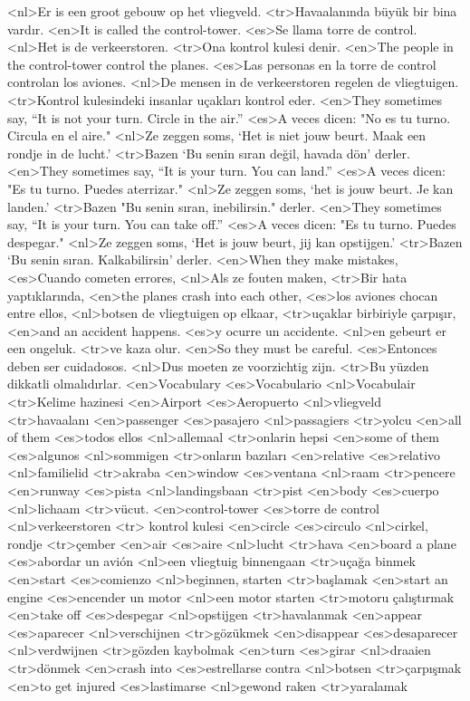 <nl>Er is een groot gebouw op het vliegveld.
<tr>Havaalanında büyük bir bina vardır.
<en>It is called the control-tower.
<es>Se llama torre de control.
<nl>Het is de verkeerstoren.
<tr>Ona kontrol kulesi denir.
<en>The people in the control-tower control the planes.
<es>Las personas en la torre de control controlan los aviones.
<nl>De mensen in de verkeerstoren regelen de vliegtuigen.
<tr>Kontrol kulesindeki insanlar uçakları kontrol eder.
<en>They sometimes say, “It is not your turn. Circle in the air.”
<es>A veces dicen: "No es tu turno. Circula en el aire."
<nl>Ze zeggen soms, `Het is niet jouw beurt. Maak een rondje in de lucht.'
<tr>Bazen ‘Bu senin sıran değil, havada dön’ derler.
<en>They sometimes say, “It is your turn. You can land.”
<es>A veces dicen: "Es tu turno. Puedes aterrizar."
<nl>Ze zeggen soms, `het is jouw beurt. Je kan landen.'
<tr>Bazen "Bu senin sıran, inebilirsin." derler.
<en>They sometimes say, “It is your turn. You can take off.”
<es>A veces dicen: "Es tu turno. Puedes despegar."
<nl>Ze zeggen soms, `Het is jouw beurt, jij kan opstijgen.'
<tr>Bazen ‘Bu senin sıran. Kalkabilirsin’ derler.
<en>When they make mistakes,
<es>Cuando cometen errores,
<nl>Als ze fouten maken, 
<tr>Bir hata yaptıklarında,
<en>the planes crash into each other,
<es>los aviones chocan entre ellos,
<nl>botsen de vliegtuigen op elkaar,
<tr>uçaklar birbiriyle çarpışır,
<en>and an accident happens.
<es>y ocurre un accidente.
<nl>en gebeurt er een ongeluk.
<tr>ve kaza olur.
<en>So they must be careful.
<es>Entonces deben ser cuidadosos.
<nl>Dus moeten ze voorzichtig zijn.
<tr>Bu yüzden dikkatli olmalıdırlar.
<en>Vocabulary
<es>Vocabulario
<nl>Vocabulair
<tr>Kelime hazinesi
<en>Airport
<es>Aeropuerto
<nl>vliegveld
<tr>havaalanı
<en>passenger
<es>pasajero
<nl>passagiers
<tr>yolcu
<en>all of them
<es>todos ellos
<nl>allemaal
<tr>onlarin hepsi
<en>some of them
<es>algunos
<nl>sommigen  
<tr>onların bazıları
<en>relative
<es>relativo
<nl>familielid  
<tr>akraba
<en>window
<es>ventana
<nl>raam  
<tr>pencere
<en>runway
<es>pista
<nl>landingsbaan  
<tr>pist
<en>body
<es>cuerpo
<nl>lichaam  
<tr>vücut.
<en>control-tower
<es>torre de control
<nl>verkeerstoren 
<tr> kontrol kulesi
<en>circle
<es>circulo
<nl>cirkel, rondje 
<tr>çember
<en>air
<es>aire
<nl>lucht 
<tr>hava
<en>board a plane
<es>abordar un avión
<nl>een vliegtuig binnengaan 
<tr>uçağa binmek
<en>start
<es>comienzo
<nl>beginnen, starten 
<tr>başlamak
<en>start an engine
<es>encender un motor
<nl>een motor starten 
<tr>motoru çalıştırmak
<en>take off
<es>despegar
<nl>opstijgen 
<tr>havalanmak
<en>appear
<es>aparecer
<nl>verschijnen 
<tr>gözükmek
<en>disappear
<es>desaparecer
<nl>verdwijnen 
<tr>gözden kaybolmak
<en>turn
<es>girar
<nl>draaien 
<tr>dönmek
<en>crash into
<es>estrellarse contra
<nl>botsen 
<tr>çarpışmak
<en>to get injured
<es>lastimarse
<nl>gewond raken 
<tr>yaralamak
